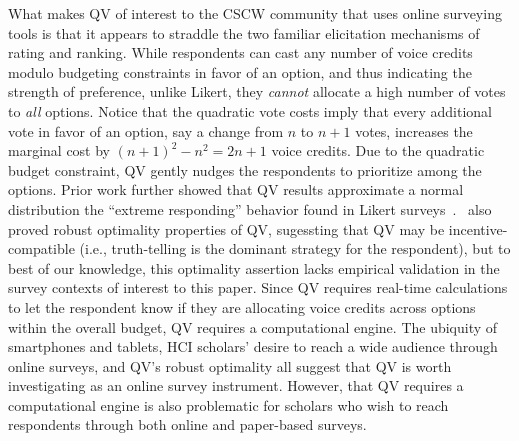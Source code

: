 
What makes QV of interest to the CSCW community that uses online surveying tools is that it appears to straddle the two familiar elicitation mechanisms of rating and ranking. While respondents can cast any number of voice credits modulo budgeting constraints in favor of an option, and thus indicating the strength of preference, unlike Likert, they \textit{cannot} allocate a high number of votes to \textit{all} options. Notice that the quadratic vote costs imply that every additional vote in favor of an option, say a change from $n$ to $n+1$ votes, increases the marginal cost by $(n+1)^2-n^2=2n+1$ voice credits. Due to the quadratic budget constraint, QV gently nudges the respondents to prioritize among the options. Prior work further showed that QV results approximate a normal distribution   the ``extreme responding'' behavior found in Likert surveys~\cite{quarfoot2017quadratic}.~\textcite{Lalley2018} also proved robust optimality properties of QV, sugessting that QV may be incentive-compatible (i.e., truth-telling is the dominant strategy for the respondent), but to best of our knowledge, this optimality assertion lacks empirical validation in the survey contexts of interest to this paper. Since QV requires real-time calculations to let the respondent know if they are allocating voice credits across options within the overall budget, QV requires a computational engine. The ubiquity of smartphones and tablets, HCI scholars' desire to reach a wide audience through online surveys, and QV's robust optimality all suggest that QV is worth investigating as an online survey instrument. However, that QV requires a computational engine is also problematic for scholars who wish to reach respondents through both online and paper-based surveys.









